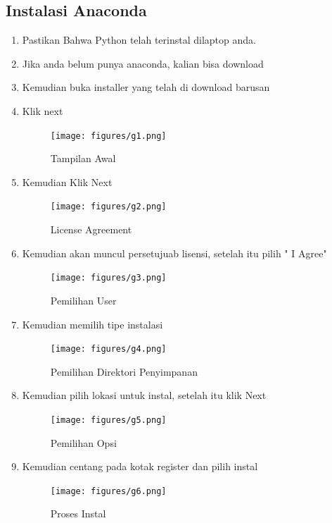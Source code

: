 \subsection{Instalasi Anaconda}
\begin{enumerate}
    \item Pastikan Bahwa Python telah terinstal dilaptop anda.
    \item Jika anda belum punya anaconda, kalian bisa download
    \item Kemudian buka installer yang telah di download barusan
    \item Klik next
    \begin{figure}[!htbp]
        \centering
        \texttt{[image: figures/g1.png]}
        \caption{Tampilan Awal}
        \label{awal}
        \end{figure}

    \item Kemudian Klik Next
    \begin{figure}[!htbp]
        \centering
        \texttt{[image: figures/g2.png]}
        \caption{License Agreement}
        \label{License}
        \end{figure}

    \item Kemudian akan muncul persetujuab lisensi, setelah itu pilih " I Agree"
    \begin{figure}[!htbp]
        \centering
        \texttt{[image: figures/g3.png]}
        \caption{Pemilihan User}
        \label{User}
        \end{figure}

    \item Kemudian memilih tipe instalasi
    \begin{figure}[!htbp]
        \centering
        \texttt{[image: figures/g4.png]}
        \caption{Pemilihan Direktori Penyimpanan}
        \label{Directory}
        \end{figure}

    \item Kemudian pilih lokasi untuk instal, setelah itu klik Next
    \begin{figure}[!htbp]
        \centering
        \texttt{[image: figures/g5.png]}
        \caption{Pemilihan Opsi}
        \label{opsi}
        \end{figure}

    \item Kemudian centang pada kotak register dan pilih instal
    \begin{figure}[!htbp]
        \centering
        \texttt{[image: figures/g6.png]}
        \caption{Proses Instal}
        \label{Proses}
        \end{figure}


\end{enumerate}

